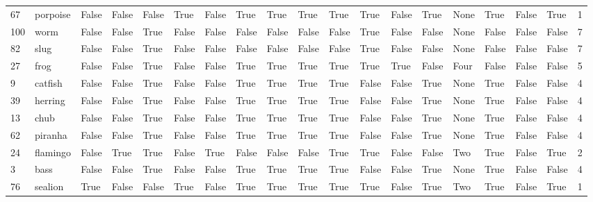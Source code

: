 \begin{tabular}{llllllllllllllllllr}
67  &    porpoise &  False &     False &  False &   True &     False &     True &      True &     True &      True &      True &     False &   True &   None &   True &     False &     True &           1 \\
100 &        worm &  False &     False &   True &  False &     False &    False &     False &    False &     False &      True &     False &  False &   None &  False &     False &    False &           7 \\
82  &        slug &  False &     False &   True &  False &     False &    False &     False &    False &     False &      True &     False &  False &   None &  False &     False &    False &           7 \\
27  &        frog &  False &     False &   True &  False &     False &     True &      True &     True &      True &      True &      True &  False &   Four &  False &     False &    False &           5 \\
9   &     catfish &  False &     False &   True &  False &     False &     True &      True &     True &      True &     False &     False &   True &   None &   True &     False &    False &           4 \\
39  &     herring &  False &     False &   True &  False &     False &     True &      True &     True &      True &     False &     False &   True &   None &   True &     False &    False &           4 \\
13  &        chub &  False &     False &   True &  False &     False &     True &      True &     True &      True &     False &     False &   True &   None &   True &     False &    False &           4 \\
62  &     piranha &  False &     False &   True &  False &     False &     True &      True &     True &      True &     False &     False &   True &   None &   True &     False &    False &           4 \\
24  &    flamingo &  False &      True &   True &  False &      True &    False &     False &    False &      True &      True &     False &  False &    Two &   True &     False &     True &           2 \\
3   &        bass &  False &     False &   True &  False &     False &     True &      True &     True &      True &     False &     False &   True &   None &   True &     False &    False &           4 \\
76  &     sealion &   True &     False &  False &   True &     False &     True &      True &     True &      True &      True &     False &   True &    Two &   True &     False &     True &           1 \\

\end{tabular}
